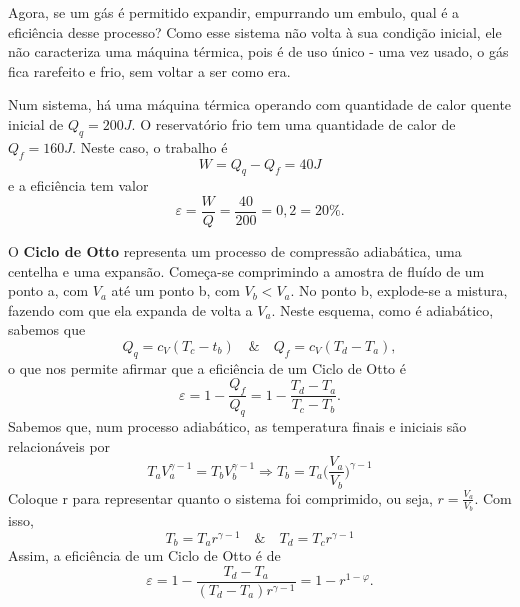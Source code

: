 \documentclass[PhysicsII/phsyicsII_notes.tex]{subfiles}
\begin{document}
Agora, se um gás é permitido expandir, empurrando um embulo, qual é a eficiência desse processo? Como esse sistema não volta à sua condição
inicial, ele não caracteriza uma máquina térmica, pois é de uso único - uma vez usado, o gás fica rarefeito e frio, sem voltar a ser como era.
\begin{example}
	Num sistema, há uma máquina térmica operando com quantidade de calor quente inicial de \(Q_{q} = 200J\). O reservatório frio
	tem uma quantidade de calor de \(Q_{f} = 160J.\) Neste caso, o trabalho é
	\[
		W = Q_{q} - Q_{f} = 40J
	\]
	e a eficiência tem valor
	\[
		\varepsilon = \frac{W}{Q} = \frac{40}{200} = 0,2 = 20\%.
	\]
\end{example}
O \textbf{Ciclo de Otto} representa um processo de compressão adiabática, uma centelha e uma expansão. Começa-se comprimindo a amostra de fluído de um ponto a, com \(V_{a}\) até um ponto b, com \(V_{b} < V_{a}.\)
No ponto b, explode-se a mistura, fazendo com que ela expanda de volta a \(V_{a}.\) Neste esquema, como é adiabático, sabemos que
\[
	Q_{q} = c_{V}(T_{c}-t_{b})\quad\&\quad Q_{f} = c_{V}(T_{d}-T_{a}),
\]
o que nos permite afirmar que a eficiência de um Ciclo de Otto é
\[
	\varepsilon  = 1 - \frac{Q_{f}}{Q_{q}} = 1 - \frac{T_{d} - T_{a}}{T_{c} - T_{b}}.
\]
Sabemos que, num processo adiabático, as temperatura finais e iniciais são relacionáveis por
\[
	T_{a}V_{a}^{\gamma -1} = T_{b}V_{b}^{\gamma -1} \Rightarrow T_{b} = T_{a}\biggl(\frac{V_{a}}{V_{b}}\biggr)^{\gamma -1}
\]
Coloque r para representar quanto o sistema foi comprimido, ou seja, \(r = \frac{V_{a}}{V_{b}}\). Com isso,
\[
	T_{b} = T_{a}r^{\gamma -1}\quad\&\quad T_{d} = T_{c}r^{\gamma -1}
\]
Assim, a eficiência de um Ciclo de Otto é de
\[
	\varepsilon = 1 - \frac{T_{d}-T_{a}}{(T_{d}-T_{a})r^{\gamma -1}}= 1 - r^{1-\varphi }.
\]
\end{document}
